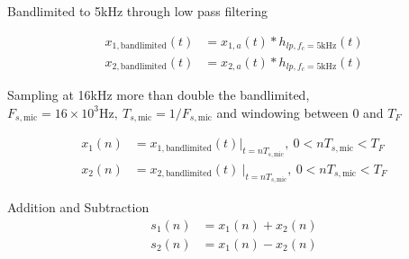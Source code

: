 \documentclass[journal]{IEEEtran}
\begin{document}
Bandlimited to 5kHz through low pass filtering


\begin{equation*}
    \begin{aligned}
        x_{1,\text{bandlimited}}( t) & =x_{1,a}( t) *h_{lp,f_{c} =5\text{kHz}}( t) \\
        x_{2,\text{bandlimited}}( t) & =x_{2,a}( t) *h_{lp,f_{c} =5\text{kHz}}( t)
    \end{aligned}
\end{equation*}


Sampling at 16kHz more than double the bandlimited, \(\displaystyle
F_{s,\text{mic}} =16\times 10^{3}\text{Hz} ,\ T_{s,\text{mic}}
=1/F_{s,\text{mic}}\) and windowing between 0 and \(\displaystyle T_{F}\)

\begin{equation*}
    \begin{aligned}
        x_{1}( n) & =x_{1,\text{bandlimited}}( t)\Bigr|_{t=nT_{s,\text{mic}}} ,\ 0< nT_{s,\text{mic}} < T_{F}    \\
        x_{2}( n) & =x_{2,\text{bandlimited}}( t) \ \Bigr|_{t=nT_{s,\text{mic}}} ,\ 0< nT_{s,\text{mic}} < T_{F}
    \end{aligned}
\end{equation*}


Addition and Subtraction
\begin{equation*}
    \begin{aligned}
        s_{1}( n) & =x_{1}( n) +x_{2}( n) \\
        s_{2}( n) & =x_{1}( n) -x_{2}( n)
    \end{aligned}
\end{equation*}
\end{document}
